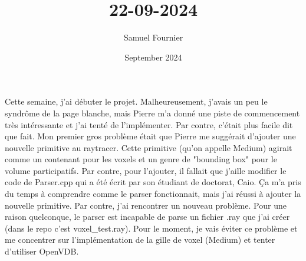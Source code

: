 \documentclass{article}
\title{22-09-2024}
\author{Samuel Fournier}
\date{September 2024}
\begin{document}
\maketitle

Cette semaine, j'ai débuter le projet. Malheureusement, j'avais un peu le syndrôme de la page blanche, mais Pierre m'a donné une piste de commencement très intéressante et j'ai tenté de l'implémenter. Par contre, c'était plus facile dit que fait. Mon premier gros problème était que Pierre me suggérait d'ajouter une nouvelle primitive au raytracer. Cette primitive (qu'on appelle Medium) agirait comme un contenant pour les voxels et un genre de "bounding box" pour le volume participatifs. Par contre, pour l'ajouter, il fallait que j'aille modifier le code de Parser.cpp qui a été écrit par son étudiant de doctorat, Caio. Ça m'a pris du temps à comprendre comme le parser fonctionnait, mais j'ai réussi à ajouter la nouvelle primitive. Par contre, j'ai rencontrer un nouveau problème. Pour une raison quelconque, le parser est incapable de parse un fichier .ray que j'ai créer (dans le repo c'est voxel\_test.ray). Pour le moment, je vais éviter ce problème et me concentrer sur l'implémentation de la gille de voxel (Medium) et tenter d'utiliser OpenVDB.
\end{document}
